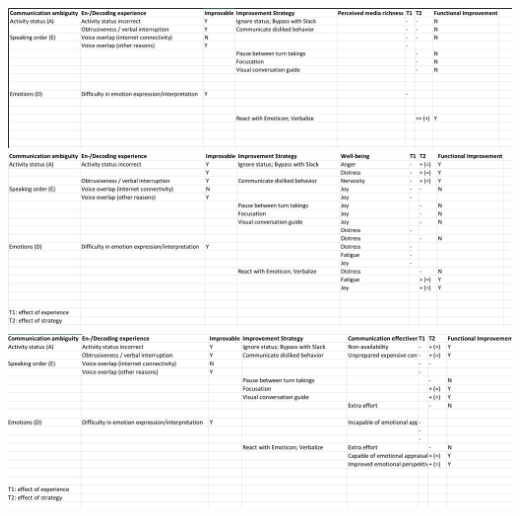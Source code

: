 \documentclass[man]{apa7}
\begin{document}
\includegraphics{table-1-perceived-richness.jpg}
\includegraphics{table-2-well-being.jpg}
\includegraphics{table-3-comm-effect.jpg}
\end{document}
